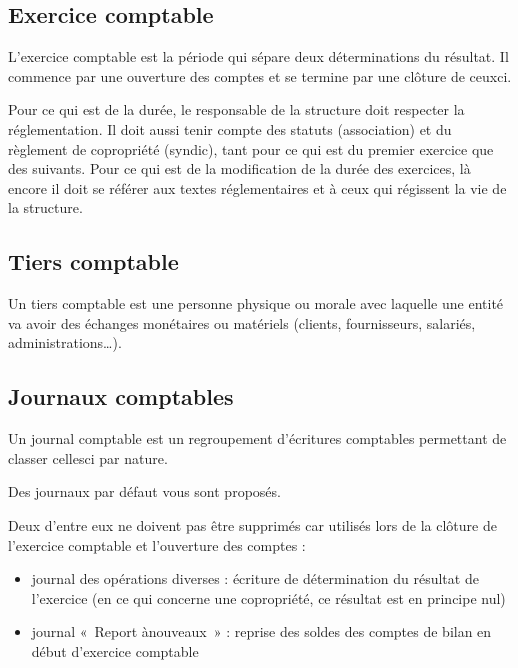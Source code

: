 \documentclass[a4paper,10pt,oneside,french]{sphinxmanual}
\begin{document}
\subsection{Exercice comptable}
\label{\detokenize{accounting/definition:exercice-comptable}}
\sphinxAtStartPar
L’exercice comptable est la période qui sépare deux déterminations du résultat. Il commence par une ouverture des comptes et se termine par une clôture de ceux\sphinxhyphen{}ci.

\sphinxAtStartPar
Pour ce qui est de la durée, le responsable de la structure doit respecter la réglementation. Il doit aussi tenir compte des statuts (association) et du règlement de copropriété (syndic), tant pour ce qui est du premier exercice que des suivants. Pour ce qui est de la modification de la durée des exercices, là encore il doit se référer aux textes réglementaires et à ceux qui régissent la vie de la structure.


\subsection{Tiers comptable}
\label{\detokenize{accounting/definition:tiers-comptable}}
\sphinxAtStartPar
Un tiers comptable est une personne physique ou morale avec laquelle une entité va avoir des échanges monétaires ou matériels (clients, fournisseurs, salariés, administrations…).


\subsection{Journaux comptables}
\label{\detokenize{accounting/definition:journaux-comptables}}
\sphinxAtStartPar
Un journal comptable est un regroupement d’écritures comptables permettant de classer celles\sphinxhyphen{}ci par nature.

\sphinxAtStartPar
Des journaux par défaut vous sont proposés.

\sphinxAtStartPar
Deux d’entre eux ne doivent pas être supprimés car utilisés lors de la clôture de l’exercice comptable et l’ouverture des comptes :
\begin{itemize}
\item {} 
\sphinxAtStartPar
journal des opérations diverses : écriture de détermination du résultat de l’exercice (en ce qui concerne une copropriété, ce résultat est en principe nul)

\item {} 
\sphinxAtStartPar
journal « Report à\sphinxhyphen{}nouveaux » : reprise des soldes des comptes de bilan en début d’exercice comptable

\end{itemize}
\end{document}
